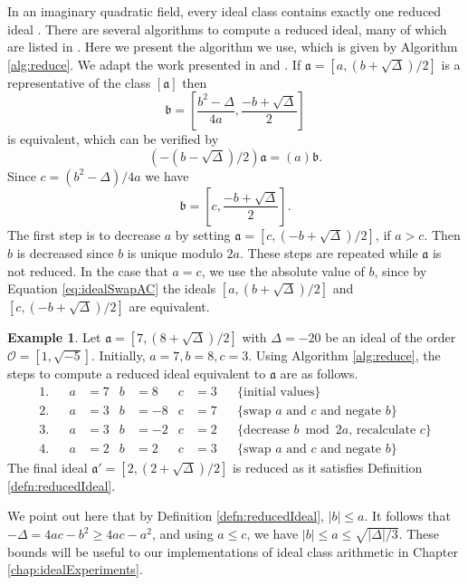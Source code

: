\documentclass{ucalgthes1}
\theoremstyle{definition}
\newtheorem{example}[thm]{Example}
\newcommand{\OO}{\mathcal{O}}
\newcommand{\ideal}{\mathfrak}
\newcommand{\idealclass}[1]{\left[ \ideal #1 \right]}
\newcommand{\aclass}{\idealclass a}
\begin{document}
In an imaginary quadratic field, every ideal class contains exactly one reduced ideal \cite[p.20]{Ramachandran2006}.  There are several algorithms to compute a reduced ideal, many of which are listed in \cite{Jacobson2006}.  Here we present the algorithm we use, which is given by Algorithm \ref{alg:reduce}.  We adapt the work presented in \cite[p.90]{Jacobson2006} and \cite[p.99]{Jacobson2009}. If $\ideal a = [a, (b + \sqrt\Delta)/2]$ is a representative of the class $\aclass$ then
\begin{equation}
\label{eq:idealSwapNorm}
	\ideal b = \left[ \frac{b^2-\Delta}{4a}, \frac{-b + \sqrt\Delta}{2} \right]
\end{equation}
is equivalent, which can be verified by
\[
	\left(-(b - \sqrt\Delta)/2 \right) \ideal a = (a) \ideal b.
\]
Since $c = (b^2 - \Delta)/4a$ we have
\begin{equation}
\label{eq:idealSwapAC}
	\ideal b = \left[ c, \frac{-b + \sqrt\Delta}{2} \right].
\end{equation}
The first step is to decrease $a$ by setting $\ideal a = [c, (-b + \sqrt\Delta)/2]$, if $a > c$.  Then $b$ is decreased since $b$ is unique modulo $2a$.  These steps are repeated while $\ideal a$ is not reduced. In the case that $a = c$, we use the absolute value of $b$, since by Equation \eqref{eq:idealSwapAC} the ideals $[a, (b + \sqrt\Delta)/2]$ and $[c, (-b+\sqrt\Delta)/2]$ are equivalent.  

\begin{example}
Let $\ideal a = [7, (8 + \sqrt{\Delta})/2]$ with $\Delta = -20$ be an ideal of the order $\OO = [1, \sqrt{-5}]$.  Initially, $a = 7, b = 8, c = 3$.  Using Algorithm \ref{alg:reduce}, the steps to compute a reduced ideal equivalent to $\ideal a$ are as follows.
\begin{align*}
1. && a &= 7 & b &= 8 & c &= 3 && \textrm{\{initial values\}} \\
2. && a &= 3 & b &= -8 & c &= 7 && \textrm{\{swap $a$ and $c$ and negate $b$\}} \\
3. && a &= 3 & b &= -2 & c &= 2 && \textrm{\{decrease $b \bmod 2a$, recalculate $c$\}} \\
4. && a &= 2 & b &= 2  & c &= 3 && \textrm{\{swap $a$ and $c$ and negate $b$\}}
\end{align*}
The final ideal $\ideal{a'} = [2, (2 + \sqrt \Delta)/2]$ is reduced as it satisfies Definition \ref{defn:reducedIdeal}.
\end{example}

We point out here that by Definition \ref{defn:reducedIdeal}, $|b| \le a$.  It follows that $-\Delta = 4ac - b^2 \ge 4ac -a^2$, and using $a \le c$, we have $|b| \le a \le \sqrt{|\Delta|/3}$.  These bounds will be useful to our implementations of ideal class arithmetic in Chapter \ref{chap:idealExperiments}.
\end{document}
